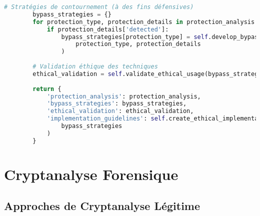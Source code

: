 \begin{lstlisting}[language=Python, caption=Système de détection et déobfuscation avancé]
        # Stratégies de contournement (à des fins défensives)
        bypass_strategies = {}
        for protection_type, protection_details in protection_analysis.items():
            if protection_details['detected']:
                bypass_strategies[protection_type] = self.develop_bypass_strategy(
                    protection_type, protection_details
                )
                
        # Validation éthique des techniques
        ethical_validation = self.validate_ethical_usage(bypass_strategies)
        
        return {
            'protection_analysis': protection_analysis,
            'bypass_strategies': bypass_strategies,
            'ethical_validation': ethical_validation,
            'implementation_guidelines': self.create_ethical_implementation_guidelines(
                bypass_strategies
            )
        }
\end{lstlisting}

\section{Cryptanalyse Forensique}

\subsection{Approches de Cryptanalyse Légitime}

